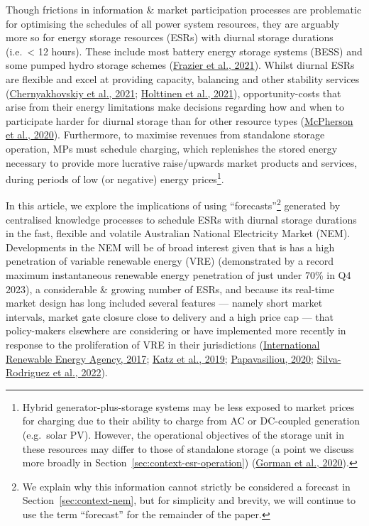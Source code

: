 \documentclass[12pt,a4paper,]{report}
\begin{document}
Though frictions in information \& market participation processes are
problematic for optimising the schedules of all power system resources,
they are arguably more so for energy storage resources (ESRs) with
diurnal storage durations (i.e.~\textless{} 12 hours). These include
most battery energy storage systems (BESS) and some pumped hydro storage
schemes (\protect\hyperlink{ref-frazierStorageFuturesStudy2021}{Frazier
et al., 2021}). Whilst diurnal ESRs are flexible and excel at providing
capacity, balancing and other stability services
(\protect\hyperlink{ref-chernyakhovskiyUSAIDEnergyStorage2021}{Chernyakhovskiy
et al., 2021};
\protect\hyperlink{ref-holttinenDesignOperationEnergy2021}{Holttinen et
al., 2021}), opportunity-costs that arise from their energy limitations
make decisions regarding how and when to participate harder for diurnal
storage than for other resource types
(\protect\hyperlink{ref-mcphersonImpactsStorageDispatch2020}{McPherson
et al., 2020}). Furthermore, to maximise revenues from standalone
storage operation, MPs must schedule charging, which replenishes the
stored energy necessary to provide more lucrative raise/upwards market
products and services, during periods of low (or negative) energy
prices\footnote{Hybrid generator-plus-storage systems may be less
  exposed to market prices for charging due to their ability to charge
  from AC or DC-coupled generation (e.g.~solar PV). However, the
  operational objectives of the storage unit in these resources may
  differ to those of standalone storage (a point we discuss more broadly
  in Section~\ref{sec:context-esr-operation})
  (\protect\hyperlink{ref-gormanMotivationsOptionsDeploying2020}{Gorman
  et al., 2020}).}.

In this article, we explore the implications of using
``forecasts''\footnote{We explain why this information cannot strictly
  be considered a forecast in Section~\ref{sec:context-nem}, but for
  simplicity and brevity, we will continue to use the term ``forecast''
  for the remainder of the paper.} generated by centralised knowledge
processes to schedule ESRs with diurnal storage durations in the fast,
flexible and volatile Australian National Electricity Market (NEM).
Developments in the NEM will be of broad interest given that is has a
high penetration of variable renewable energy (VRE) (demonstrated by a
record maximum instantaneous renewable energy penetration of just under
70\% in Q4 2023), a considerable \& growing number of ESRs, and because
its real-time market design has long included several features ---
namely short market intervals, market gate closure close to delivery and
a high price cap --- that policy-makers elsewhere are considering or
have implemented more recently in response to the proliferation of VRE
in their jurisdictions
(\protect\hyperlink{ref-internationalrenewableenergyagencyAdaptingMarketDesign2017}{International
Renewable Energy Agency, 2017};
\protect\hyperlink{ref-katzOpeningMarketsDesigning2019}{Katz et al.,
2019};
\protect\hyperlink{ref-papavasiliouScarcityPricingMissing2020}{Papavasiliou,
2020};
\protect\hyperlink{ref-silva-rodriguezShortTermWholesale2022}{Silva-Rodriguez
et al., 2022}).
\end{document}
